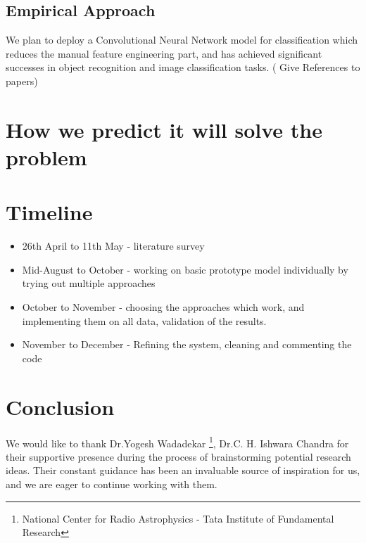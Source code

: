 \documentclass{article}
\begin{document}
\begin{multicols*}{2}
\subsection{Empirical Approach}

We plan to deploy a Convolutional Neural Network model for classification which reduces the manual feature engineering part, and has achieved significant successes in object recognition and image classification tasks. ( Give References to papers) 
    


\section{How we predict it will solve the problem}

\section{Timeline}
\begin{itemize}
	\item 26th April to 11th May - literature survey
	\item Mid-August to October - working on basic prototype model individually by trying out multiple approaches
	\item October to November - choosing the approaches which work, and implementing them on all data, validation of the results.
	\item November to December - Refining the system, cleaning and commenting the code
\end{itemize} 





\section{Conclusion}
We would like to thank Dr.Yogesh Wadadekar \footnote{\label{NCRA-TIFR} National Center for Radio Astrophysics - Tata Institute of Fundamental Research}, Dr.C. H. Ishwara Chandra \footnotemark[\ref{NCRA-TIFR}] for their supportive presence during the process of brainstorming potential research ideas. Their constant guidance has been an invaluable source of inspiration for us, and we are eager to continue working with them.

\end{multicols*}
\end{document}
